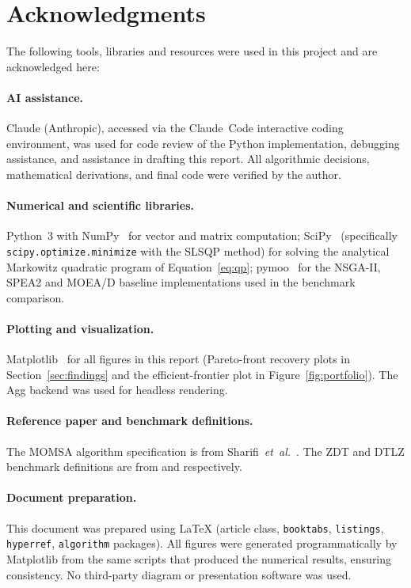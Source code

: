 \documentclass[11pt,a4paper]{article}
\begin{document}
\section*{Acknowledgments}

The following tools, libraries and resources were used in this project
and are acknowledged here:

\paragraph{AI assistance.}
Claude (Anthropic), accessed via the Claude~Code interactive coding
environment, was used for code review of the Python implementation,
debugging assistance, and assistance in drafting this report. All
algorithmic decisions, mathematical derivations, and final code were
verified by the author.

\paragraph{Numerical and scientific libraries.}
Python~3 with NumPy~\cite{numpy} for vector and matrix
computation; SciPy~\cite{scipy} (specifically
\texttt{scipy.optimize.minimize} with the SLSQP method) for solving the
analytical Markowitz quadratic program of
Equation~\eqref{eq:qp}; pymoo~\cite{pymoo} for the NSGA-II, SPEA2 and
MOEA/D baseline implementations used in the benchmark comparison.

\paragraph{Plotting and visualization.}
Matplotlib~\cite{matplotlib} for all figures in this report (Pareto-front
recovery plots in Section~\ref{sec:findings} and the efficient-frontier
plot in Figure~\ref{fig:portfolio}). The Agg backend was used for
headless rendering.

\paragraph{Reference paper and benchmark definitions.}
The MOMSA algorithm specification is from
Sharifi~\textit{et~al.}~\cite{sharifi2021momsa}. The ZDT and DTLZ
benchmark definitions are from \cite{zitzler2000zdt} and
\cite{deb2005dtlz} respectively.

\paragraph{Document preparation.}
This document was prepared using \LaTeX{} (article class, \texttt{booktabs},
\texttt{listings}, \texttt{hyperref}, \texttt{algorithm} packages). All
figures were generated programmatically by Matplotlib from the same
scripts that produced the numerical results, ensuring consistency. No
third-party diagram or presentation software was used.
\end{document}
